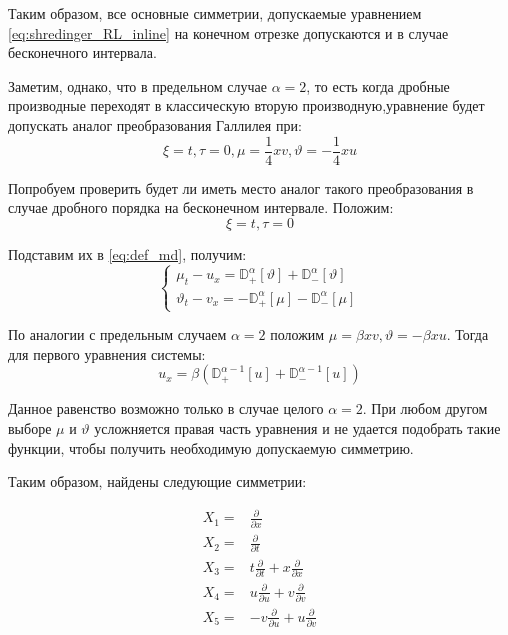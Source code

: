 \documentclass[a4paper, fontsize=14pt]{article}
\newcommand{\MD}[2]{\mathbb{D}_{#1}^{\alpha}[#2]} %
\begin{document}
Таким образом, все основные симметрии, допускаемые уравнением \eqref{eq:shredinger_RL_inline} на конечном отрезке допускаются и в случае бесконечного интервала.

Заметим, однако, что в предельном случае $\alpha = 2$, то есть когда дробные производные переходят в классическую вторую производную,уравнение будет допускать аналог преобразования Галлилея при:
\begin{equation*}
  \xi = t, \tau = 0, \mu = \frac{1}{4} xv, \vartheta = - \frac{1}{4} xu
\end{equation*}

Попробуем проверить будет ли иметь место аналог такого преобразования в случае дробного порядка на бесконечном интервале. Положим:
\begin{equation*}
  \xi = t, \tau = 0
\end{equation*}

Подставим их в \eqref{eq:def_md}, получим:
\begin{equation*}
  \begin{cases}
    \mu_t - u_x = \MD{+}{\vartheta} + \MD{-}{\vartheta} \\
    \vartheta_t - v_x = -\MD{+}{\mu} - \MD{-}{\mu}
  \end{cases}
\end{equation*}

По аналогии с предельным случаем $\alpha = 2$  положим $\mu = \beta x v, \vartheta = - \beta x u$. Тогда для первого уравнения системы:
\begin{equation*}
  u_x = \beta \left(\mathbb{D}_{+}^{\alpha-1}[u] + \mathbb{D}_{-}^{\alpha-1}[u]\right)
\end{equation*}

Данное равенство возможно только в случае целого $\alpha = 2$.
При любом другом выборе $\mu$ и $\vartheta$ усложняется правая часть уравнения и не удается подобрать такие функции,
чтобы получить необходимую допускаемую симметрию.

Таким образом, найдены следующие симметрии:

\begin{equation*}
  \begin{aligned}
    X_1 =& \frac{\partial}{\partial x}\\
    X_2 =& \frac{\partial}{\partial t}\\
    X_3 =& t \frac{\partial}{\partial t} + x \frac{\partial}{\partial x}\\
    X_4 =& u \frac{\partial}{\partial u} + v \frac{\partial}{\partial v}\\
    X_5 =& -v \frac{\partial}{\partial u} + u \frac{\partial}{\partial v}
  \end{aligned}
\end{equation*}
\end{document}
